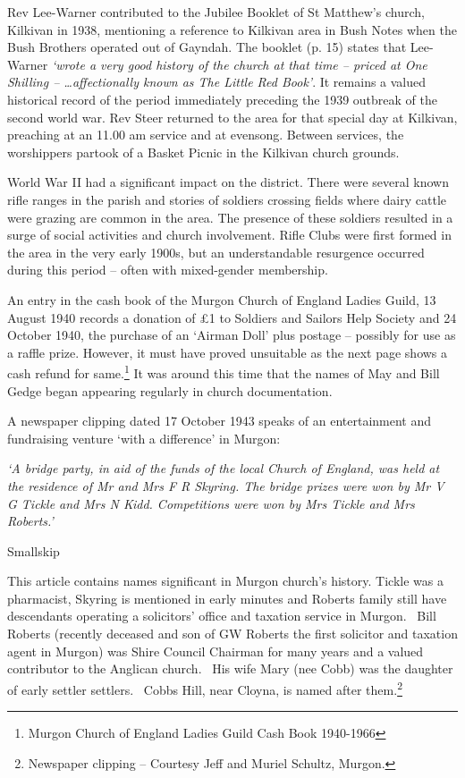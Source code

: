 Rev Lee-Warner contributed to the Jubilee Booklet of St Matthew's church, Kilkivan in 1938, mentioning a reference to Kilkivan area in Bush Notes when the Bush Brothers operated out of Gayndah. The booklet (p. 15) states that Lee-Warner \emph{`wrote a very good history of the church at that time -- priced at One Shilling -- \ldots affectionally known as The Little Red Book'}. It remains a valued historical record of the period immediately preceding the 1939 outbreak of the second world war. Rev Steer returned to the area for that special day at Kilkivan, preaching at an 11.00 am service and at evensong. Between services, the worshippers partook of a Basket Picnic in the Kilkivan church grounds.

World War II had a significant impact on the district. There were several known rifle ranges in the parish and stories of soldiers crossing fields where dairy cattle were grazing are common in the area. The presence of these soldiers resulted in a surge of social activities and church involvement. Rifle Clubs were first formed in the area in the very early 1900s, but an understandable resurgence occurred during this period -- often with mixed-gender membership.

An entry in the cash book of the Murgon Church of England Ladies Guild, 13 August 1940 records a donation of £1 to Soldiers and Sailors Help Society and 24 October 1940, the purchase of an `Airman Doll' plus postage -- possibly for use as a raffle prize. However, it must have proved unsuitable as the next page shows a cash refund for same.\footnote{Murgon Church of England Ladies Guild Cash Book 1940-1966} It was around this time that the names of May and Bill Gedge began appearing regularly in church documentation.

A newspaper clipping dated 17 October 1943 speaks of an entertainment and fundraising venture `with a difference' in Murgon:

\emph{`A bridge party, in aid of the funds of the local Church of England, was held at the residence of Mr and Mrs F R Skyring. The bridge prizes were won by Mr V G Tickle and Mrs N Kidd. Competitions were won by Mrs Tickle and Mrs Roberts.'}

Smallskip

This article contains names significant in Murgon church's history. Tickle was a pharmacist, Skyring is mentioned in early minutes and Roberts family still have descendants operating a solicitors' office and taxation service in Murgon.~ Bill Roberts (recently deceased and son of GW Roberts the first solicitor and taxation agent in Murgon) was Shire Council Chairman for many years and a valued contributor to the Anglican church.~ His wife Mary (nee Cobb) was the daughter of early settler settlers.~ Cobbs Hill, near Cloyna, is named after them.\footnote{Newspaper clipping -- Courtesy Jeff and Muriel Schultz, Murgon.}

